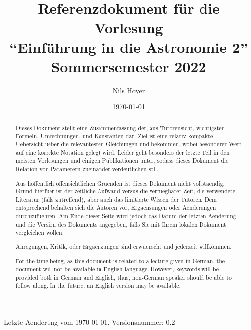 \documentclass[a4paper,11pt]{article}
\author{Nils Hoyer}
\date{\today}
\title{%
  Referenzdokument für die Vorlesung\\ ``Einführung in die Astronomie 2''\\[10pt]
  \large
  Sommersemester 2022
}
\begin{document}
\thispagestyle{empty}
\maketitle


\begin{abstract}
Dieses Dokument stellt eine Zusammenfassung der, aus Tutorensicht, wichtigsten Formeln, Umrechnungen, und Konstanten dar.
Ziel ist eine relativ kompakte Uebersicht ueber die relevantesten Gleichungen und bekommen, wobei besonderer Wert auf eine korrekte Notation gelegt wird.
Leider geht besonders der letzte Teil in den meisten Vorlesungen und einigen Publikationen unter, sodass dieses Dokument die Relation von Parametern zueinander verdeutlichen soll.

Aus hoffentlich offensichtlichen Gruenden ist dieses Dokument nicht vollstaendig.
Grund hierfuer ist der zeitliche Aufwand versus die verfuegbarer Zeit, die verwendete Literatur (falls zutreffend), aber auch das limitierte Wissen der Tutoren.
Dem entsprechend behalten sich die Autoren vor, Ergaenzungen oder Aenderungen durchzufuehren.
Am Ende dieser Seite wird jedoch das Datum der letzten Aenderung und die Version des Dokuments angegeben, falls Sie mit Ihrem lokalen Dokument vergleichen wollen.

Anregungen, Kritik, oder Ergaenzungen sind erwuenscht und jederzeit willkommen.

\vspace{10pt}
For the time being, as this document is related to a lecture given in German, the document will not be available in English language.
However, keywords will be provided both in German and English, thus, non-German speaker should be able to follow along.
In the future, an English version may be available.
\end{abstract}


\vfill

Letzte Aenderung vom \today.
\hfill
Versionsnummer: 0.2





\end{document}
